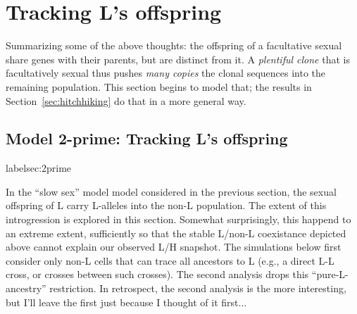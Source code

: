 \documentclass{article}\usepackage[]{graphicx}\usepackage[]{color}
\begin{document}
\section{Tracking L's offspring}
\label{sec:offspring}

Summarizing some of the above thoughts: the offspring of a facultative sexual share genes with their
parents, but are distinct from it.  A \emph{plentiful clone} that is facultatively sexual thus
pushes \emph{many copies} the clonal sequences into the remaining population.  This section begins
to model that; the results in Section~\ref{sec:hitchhiking} do that in a more general way.

\subsection{Model 2-prime: Tracking L's offspring}
label{sec:2prime}

In the ``slow sex'' model model considered in the previous section, the sexual offspring of L carry
L-alleles into the non-L population.  The extent of this introgression is explored in this section.
Somewhat surprisingly, this happend to an extreme extent, sufficiently so that the stable L/non-L
coexistance depicted above cannot explain our observed L/H snapshot.  The simulations below first
consider only non-L cells that can trace all ancestors to L (e.g., a direct L-L cross, or crosses
between such crosses).  The second analysis drops this ``pure-L-ancestry'' restriction.  In
retrospect, the second analysis is the more interesting, but I'll leave the first just because I
thought of it first...
\end{document}
